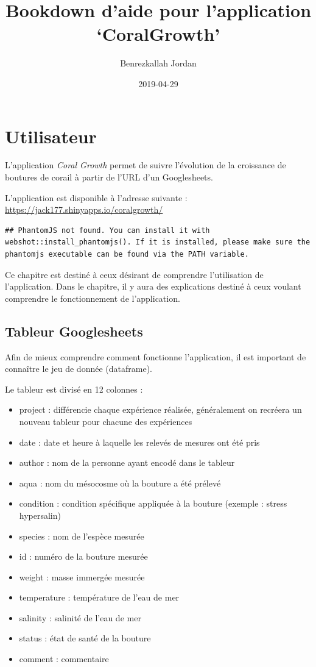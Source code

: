 \documentclass[]{book}
\title{Bookdown d'aide pour l'application `CoralGrowth'}
\author{Benrezkallah Jordan}
\date{2019-04-29}
\providecommand{\tightlist}{%
  \setlength{\itemsep}{0pt}\setlength{\parskip}{0pt}}
\begin{document}
\maketitle

{
\setcounter{tocdepth}{1}
\tableofcontents
}
\chapter{Utilisateur}\label{utilisateur}

L'application \emph{Coral Growth} permet de suivre l'évolution de la
croissance de boutures de corail à partir de l'URL d'un Googlesheets.

L'application est disponible à l'adresse suivante :
\url{https://jack177.shinyapps.io/coralgrowth/}

\begin{verbatim}
## PhantomJS not found. You can install it with webshot::install_phantomjs(). If it is installed, please make sure the phantomjs executable can be found via the PATH variable.
\end{verbatim}

Ce chapitre est destiné à ceux désirant de comprendre l'utilisation de
l'application. Dans le chapitre, il y aura des explications destiné à
ceux voulant comprendre le fonctionnement de l'application.

\section{Tableur Googlesheets}\label{tableur-googlesheets}

Afin de mieux comprendre comment fonctionne l'application, il est
important de connaître le jeu de donnée (dataframe).

Le tableur est divisé en 12 colonnes :

\begin{itemize}
\tightlist
\item
  project : différencie chaque expérience réalisée, généralement on
  recréera un nouveau tableur pour chacune des expériences
\item
  date : date et heure à laquelle les relevés de mesures ont été pris
\item
  author : nom de la personne ayant encodé dans le tableur
\item
  aqua : nom du mésocosme où la bouture a été prélevé
\item
  condition : condition spécifique appliquée à la bouture (exemple :
  stress hypersalin)
\item
  species : nom de l'espèce mesurée
\item
  id : numéro de la bouture mesurée
\item
  weight : masse immergée mesurée
\item
  temperature : température de l'eau de mer
\item
  salinity : salinité de l'eau de mer
\item
  status : état de santé de la bouture
\item
  comment : commentaire
\end{itemize}
\end{document}
